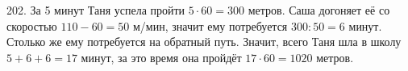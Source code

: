 202. За 5 минут Таня успела пройти $5\cdot60=300$ метров. Саша догоняет её со скоростью $110-60=50$ м/мин, значит ему потребуется $300:50=6$ минут. Столько же ему потребуется на обратный путь. Значит, всего Таня шла в школу $5+6+6=17$ минут, за это время она пройдёт $17\cdot60=1020$ метров.\\
